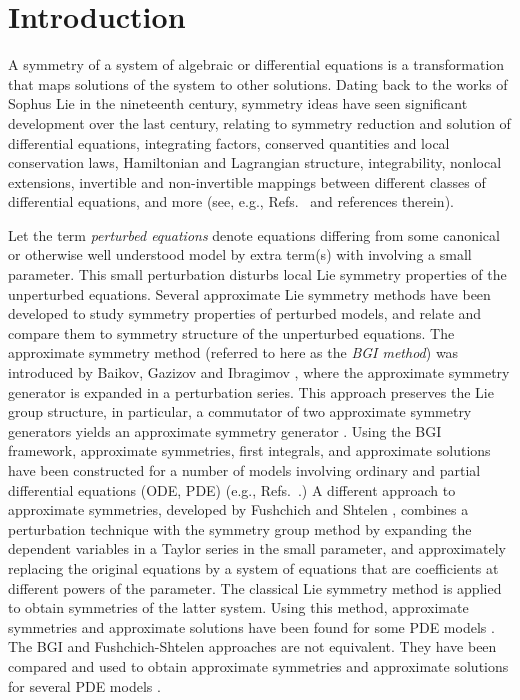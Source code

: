 \documentclass[11pt,letter,subeqn]{article}
\begin{document}
\section{Introduction}

A symmetry of a system of algebraic or differential equations is a transformation that maps solutions of the system to other solutions. Dating back to the works of Sophus Lie in the nineteenth century, symmetry ideas have seen significant development over the last century, relating to symmetry reduction and solution of differential equations, integrating factors, conserved quantities and local conservation laws, Hamiltonian and Lagrangian structure, integrability, nonlocal extensions, invertible and non-invertible mappings between different classes of differential equations, and more (see, e.g., Refs.~\cite{olver2000applications, bluman2010applications} and references therein).

Let the term \emph{perturbed equations} denote equations differing from some canonical or otherwise well understood model by extra term(s) with involving a small parameter. This small perturbation disturbs local Lie symmetry properties of the unperturbed equations.
Several approximate Lie symmetry methods have been developed to study symmetry properties of perturbed models, and relate and compare them to symmetry structure of the unperturbed equations. The approximate symmetry method (referred to here as the \emph{BGI method}) was introduced by Baikov, Gazizov and Ibragimov \cite{baikov1989, baikov1991, baikov1993}, where the approximate symmetry generator is expanded in a perturbation series. This approach preserves the Lie group structure, in particular, a commutator of two approximate symmetry generators yields an approximate symmetry generator \cite{gazizov1996lie}. Using the BGI framework, approximate symmetries, first integrals, and approximate solutions have been constructed for a number of models involving ordinary and partial differential equations (ODE, PDE) (e.g., Refs.~\cite{unal2000periodic, baikovjoining, bai2018approximate}.) A different approach to approximate symmetries, developed by Fushchich and Shtelen \cite{fushchich1989approximate}, combines a perturbation technique with the symmetry group method by expanding the dependent variables in a Taylor series in the small parameter, and approximately replacing the original equations by a system of equations that are coefficients at different powers of the parameter. The classical Lie symmetry method is applied to obtain symmetries of the latter system. Using this method, approximate symmetries and approximate solutions have been found for some PDE models \cite{euler1992approximate,euler1994}. The BGI and Fushchich-Shtelen approaches are not equivalent. They have been compared and used to obtain approximate symmetries and approximate solutions for several PDE models \cite{wiltshire2006two,grebenev2007approximate, mahdavi2015two,ahmed2017invariant}.
\end{document}
